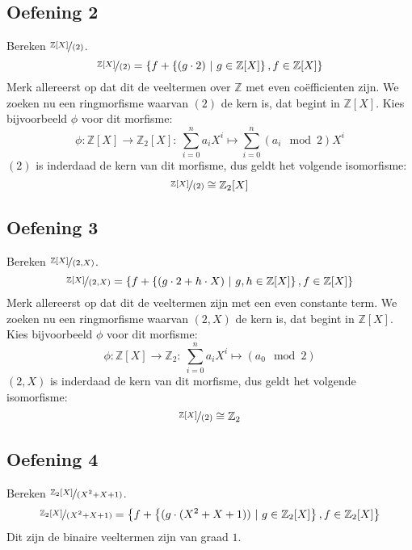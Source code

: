 \documentclass[main.tex]{subfiles}
\begin{document}
\subsection*{Oefening 2}
Bereken $\nicefrac{\mathbb{Z}[X]}{(2)}$.
\[ \nicefrac{\mathbb{Z}[X]}{(2)} = \left\{ f + \left\{ (g \cdot 2)\ |\ g\in \mathbb{Z}[X] \right\}, f \in \mathbb{Z}[X] \right\} \]
Merk allereerst op dat dit de veeltermen over $\mathbb{Z}$ met even co\"efficienten zijn.
We zoeken nu een ringmorfisme waarvan $(2)$ de kern is, dat begint in $\mathbb{Z}[X]$.
Kies bijvoorbeeld $\phi$ voor dit morfisme:
\[ \phi: \mathbb{Z}[X] \rightarrow \mathbb{Z}_{2}[X]:\ \sum_{i=0}^{n}a_{i}X^{i} \mapsto \sum_{i=0}^{n}(a_{i} \mod 2)X^{i} \]
$(2)$ is inderdaad de kern van dit morfisme, dus geldt het volgende isomorfisme:
\[ \nicefrac{\mathbb{Z}[X]}{(2)} \cong \mathbb{Z}_{2}[X] \]

\subsection*{Oefening 3}
Bereken $\nicefrac{\mathbb{Z}[X]}{(2,X)}$.
\[ \nicefrac{\mathbb{Z}[X]}{(2,X)} = \left\{ f + \left\{ (g \cdot 2 + h \cdot X)\ |\ g,h\in \mathbb{Z}[X] \right\}, f \in \mathbb{Z}[X] \right\}\]
Merk allereerst op dat dit de veeltermen zijn met een even constante term.
We zoeken nu een ringmorfisme waarvan $(2,X)$ de kern is, dat begint in $\mathbb{Z}[X]$.
Kies bijvoorbeeld $\phi$ voor dit morfisme:
\[ \phi: \mathbb{Z}[X] \rightarrow \mathbb{Z}_{2}:\ \sum_{i=0}^{n}a_{i}X^{i} \mapsto (a_{0}\mod 2) \]
$(2,X)$ is inderdaad de kern van dit morfisme, dus geldt het volgende isomorfisme:
\[ \nicefrac{\mathbb{Z}[X]}{(2)} \cong \mathbb{Z}_{2} \]

\subsection*{Oefening 4}
Bereken $\nicefrac{\mathbb{Z}_{2}[X]}{(X^{2}+X+1)}$.
\[ \nicefrac{\mathbb{Z}_{2}[X]}{(X^{2}+X+1)} =  \left\{ f + \left\{ (g \cdot (X^{2}+X+1))\ |\ g\in \mathbb{Z}_{2}[X] \right\}, f \in \mathbb{Z}_{2}[X] \right\} \]
Dit zijn de binaire veeltermen zijn van graad $1$.
\end{document}
